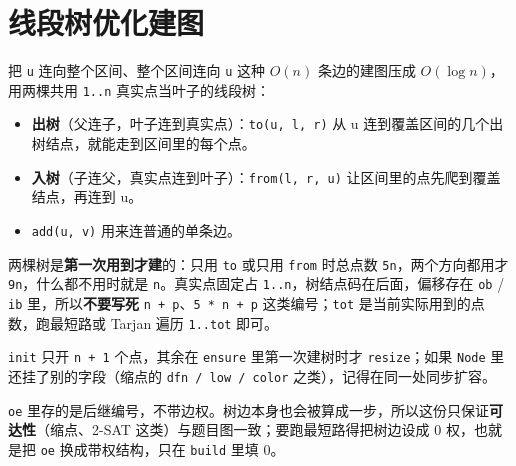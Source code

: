 \section{线段树优化建图}
把 \texttt{u} 连向整个区间、整个区间连向 \texttt{u} 这种 \(O(n)\) 条边的建图压成 \(O(\log n)\)，用两棵共用 \texttt{1..n} 真实点当叶子的线段树：

\begin{itemize}
\tightlist
\item
  \textbf{出树}（父连子，叶子连到真实点）：\texttt{to(u,\ l,\ r)} 从 u 连到覆盖区间的几个出树结点，就能走到区间里的每个点。
\item
  \textbf{入树}（子连父，真实点连到叶子）：\texttt{from(l,\ r,\ u)} 让区间里的点先爬到覆盖结点，再连到 u。
\item
  \texttt{add(u,\ v)} 用来连普通的单条边。
\end{itemize}

两棵树是\textbf{第一次用到才建}的：只用 \texttt{to} 或只用 \texttt{from} 时总点数 \texttt{5n}，两个方向都用才 \texttt{9n}，什么都不用时就是 \texttt{n}。真实点固定占 \texttt{1..n}，树结点码在后面，偏移存在 \texttt{ob} / \texttt{ib} 里，所以\textbf{不要写死} \texttt{n\ +\ p}、\texttt{5\ *\ n\ +\ p} 这类编号；\texttt{tot} 是当前实际用到的点数，跑最短路或 Tarjan 遍历 \texttt{1..tot} 即可。

\texttt{init} 只开 \texttt{n\ +\ 1} 个点，其余在 \texttt{ensure} 里第一次建树时才 \texttt{resize}；如果 \texttt{Node} 里还挂了别的字段（缩点的 \texttt{dfn\ /\ low\ /\ color} 之类），记得在同一处同步扩容。

\texttt{oe} 里存的是后继编号，不带边权。树边本身也会被算成一步，所以这份只保证\textbf{可达性}（缩点、2-SAT 这类）与题目图一致；要跑最短路得把树边设成 0 权，也就是把 \texttt{oe} 换成带权结构，只在 \texttt{build} 里填 0。


